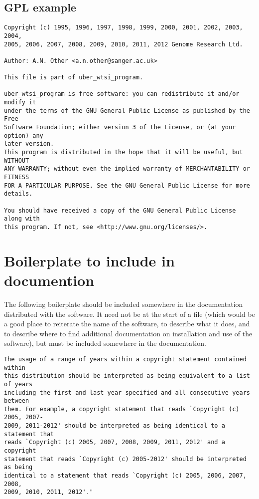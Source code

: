 \documentclass[10pt,a4paper]{article}
\begin{document}
\subsection{GPL example}

\begin{boilerplate}
\begin{verbatim}
Copyright (c) 1995, 1996, 1997, 1998, 1999, 2000, 2001, 2002, 2003, 2004, 
2005, 2006, 2007, 2008, 2009, 2010, 2011, 2012 Genome Research Ltd. 
 
Author: A.N. Other <a.n.other@sanger.ac.uk> 
 
This file is part of uber_wtsi_program. 
 
uber_wtsi_program is free software: you can redistribute it and/or modify it 
under the terms of the GNU General Public License as published by the Free 
Software Foundation; either version 3 of the License, or (at your option) any 
later version.  
This program is distributed in the hope that it will be useful, but WITHOUT 
ANY WARRANTY; without even the implied warranty of MERCHANTABILITY or FITNESS 
FOR A PARTICULAR PURPOSE. See the GNU General Public License for more 
details. 
 
You should have received a copy of the GNU General Public License along with 
this program. If not, see <http://www.gnu.org/licenses/>. 
\end{verbatim}
\end{boilerplate}


\section{Boilerplate to include in documention}

The following boilerplate should be included somewhere in the 
documentation distributed with the software. It need not be at the start of a 
file (which would be a good place to reiterate the name of the software, to 
describe what it does, and to describe where to find additional documentation 
on installation and use of the software), but must be included somewhere in 
the documentation. 

\begin{verbatim}
The usage of a range of years within a copyright statement contained within 
this distribution should be interpreted as being equivalent to a list of years 
including the first and last year specified and all consecutive years between 
them. For example, a copyright statement that reads `Copyright (c) 2005, 2007-
2009, 2011-2012' should be interpreted as being identical to a statement that 
reads `Copyright (c) 2005, 2007, 2008, 2009, 2011, 2012' and a copyright 
statement that reads `Copyright (c) 2005-2012' should be interpreted as being 
identical to a statement that reads `Copyright (c) 2005, 2006, 2007, 2008, 
2009, 2010, 2011, 2012'." 
\end{verbatim}
\end{document}
